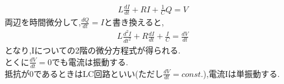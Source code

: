 \documentclass[../main]{subfiles}
\begin{document}
\begin{eqnarray*}
L\frac{dI}{dt}+RI + \frac{1}{C}Q = V
\end{eqnarray*}
両辺を時間微分して,$\frac{dQ}{dt}=I$と書き換えると,
\begin{eqnarray*}
L\frac{d^2 I}{dt^2}+R\frac{dI}{dt}+\frac{I}{C} = \frac{dV}{dt}
\end{eqnarray*}
となり,Iについての2階の微分方程式が得られる.　\\
とくに$\frac{dV}{dt}=0$でも電流は振動する. \\
抵抗が0であるときはLC回路といい(ただし$\frac{dV}{dt}=const.$),電流Iは単振動する.
\end{document}
